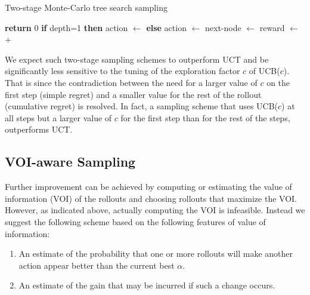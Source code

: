 \documentclass[letterpaper]{article}
\begin{document}
\begin{algorithm}[h!]
\caption{Two-stage Monte-Carlo tree search sampling}
\label{alg:two-stage-mcts}
\begin{algorithmic}[1]
    \State \textbf{return} 0
  \Else
    \State \textbf{if} depth=1 \textbf{then} action $\gets$  \label{alg:srcr-first-action}   
    \State \textbf{else} action $\gets$  \label{alg:srcr-next-action}
    \State next-node $\gets$ 
    \State reward $\gets$ 
     \State \hspace{4em} + 
    \State {}
  \EndIf
\EndProcedure
\end{algorithmic}
\end{algorithm}

We expect such two-stage sampling schemes to
outperform UCT and be
significantly less sensitive to the tuning of the exploration factor
$c$ of UCB($c$). That is since the contradiction between the need for a larger
value of $c$ on the first step (simple regret) and a smaller
value for the rest of the rollout (cumulative regret)
\cite{Bubeck.pure} is resolved. In fact, a sampling scheme that uses
UCB($c$) at all steps but a larger value of $c$ for the first step
than for the rest of the steps, outperforms UCT. 


\subsection{VOI-aware Sampling}
\label{sec:voi-sampling}

Further improvement can be achieved by computing or estimating the
value of information (VOI) of the rollouts and choosing rollouts that
maximize the VOI. 
However, as indicated above, actually computing the VOI is infeasible.
Instead we suggest the following scheme based on the following
features of value of information:
\begin{enumerate}
\item An estimate of the probability that one or more rollouts will make another action
appear better than the current best $\alpha $.
\item An estimate of the gain that may be incurred if such a change occurs.
\end{enumerate}
\end{document}
